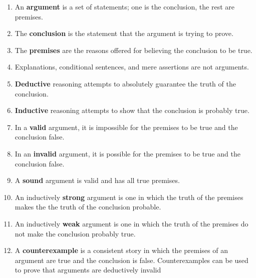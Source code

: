\begin{enumerate}

\item An \textbf{argument} is a set of statements; one is the conclusion, the rest are premises. 
\item The \textbf{conclusion} is the statement that the argument is trying to prove. 
\item The \textbf{premises} are the reasons offered for believing the
  conclusion to be true. 
\item Explanations, conditional sentences, and mere assertions are not arguments. 
\item \textbf{Deductive} reasoning attempts to absolutely guarantee the truth of the conclusion. 
\item \textbf{Inductive} reasoning attempts to show that the conclusion is probably true. 
\item In a \textbf{valid} argument, it is impossible for the premises to be true and the conclusion false. 
\item In an \textbf{invalid} argument, it is possible for the premises to be true and the conclusion false. 
\item A \textbf{sound} argument is valid and has all true premises. 
\item An inductively \textbf{strong} argument is one in which the truth of the premises makes the the truth of the conclusion probable. 
\item An inductively \textbf{weak} argument is one in which the truth of the premises do not make the conclusion probably true. 
\item A \textbf{counterexample} is a consistent story in which the premises of an argument are true and the conclusion is false. Counterexamples can be used to prove that arguments are deductively invalid
\end{enumerate}



